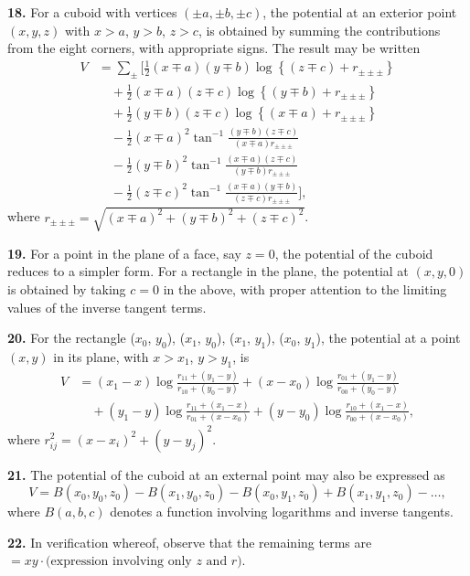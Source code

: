 \documentclass[11pt,a4paper]{article}
\begin{document}
\smallskip\noindent\textbf{18.}\quad
For a cuboid with vertices $(\pm a, \pm b, \pm c)$, the potential at an
exterior point $(x,y,z)$ with $x>a$, $y>b$, $z>c$, is obtained by summing
the contributions from the eight corners, with appropriate signs. The result
may be written
\begin{align*}
V &= \sum_{\pm} \Bigg[
    \tfrac{1}{2}(x\mp a)(y\mp b)\log\left\{(z\mp c)+r_{\pm\pm\pm}\right\} \\
  &\quad + \tfrac{1}{2}(x\mp a)(z\mp c)\log\left\{(y\mp b)+r_{\pm\pm\pm}\right\} \\
  &\quad + \tfrac{1}{2}(y\mp b)(z\mp c)\log\left\{(x\mp a)+r_{\pm\pm\pm}\right\} \\
  &\quad - \tfrac{1}{2}(x\mp a)^2
      \tan^{-1}\frac{(y\mp b)(z\mp c)}{(x\mp a)r_{\pm\pm\pm}} \\
  &\quad - \tfrac{1}{2}(y\mp b)^2
      \tan^{-1}\frac{(x\mp a)(z\mp c)}{(y\mp b)r_{\pm\pm\pm}} \\
  &\quad - \tfrac{1}{2}(z\mp c)^2
      \tan^{-1}\frac{(x\mp a)(y\mp b)}{(z\mp c)r_{\pm\pm\pm}}
  \Bigg],
\end{align*}
where $r_{\pm\pm\pm}=\sqrt{(x\mp a)^2+(y\mp b)^2+(z\mp c)^2}$.

\newpage
\noindent\textbf{19.}\quad
For a point in the plane of a face, say $z=0$, the potential of the cuboid
reduces to a simpler form. For a rectangle in the plane, the potential at
$(x,y,0)$ is obtained by taking $c=0$ in the above, with proper attention to
the limiting values of the inverse tangent terms.

\smallskip\noindent\textbf{20.}\quad
For the rectangle ($x_0$, $y_0$), ($x_1$, $y_0$), ($x_1$, $y_1$), ($x_0$, $y_1$),
the potential at a point $(x,y)$ in its plane, with $x>x_1$, $y>y_1$, is
\begin{align*}
V &= (x_1-x)\log\frac{r_{11}+(y_1-y)}{r_{10}+(y_0-y)}
  + (x-x_0)\log\frac{r_{01}+(y_1-y)}{r_{00}+(y_0-y)} \\
  &\quad + (y_1-y)\log\frac{r_{11}+(x_1-x)}{r_{01}+(x-x_0)}
  + (y-y_0)\log\frac{r_{10}+(x_1-x)}{r_{00}+(x-x_0)},
\end{align*}
where $r_{ij}^2=(x-x_i)^2+(y-y_j)^2$.

\smallskip\noindent\textbf{21.}\quad
The potential of the cuboid at an external point may also be expressed as
\[
V = B(x_0,y_0,z_0) - B(x_1,y_0,z_0) - B(x_0,y_1,z_0)
  + B(x_1,y_1,z_0) - \ldots,
\]
where $B(a,b,c)$ denotes a function involving logarithms and inverse
tangents.

\smallskip\noindent\textbf{22.}\quad
In verification whereof, observe that the remaining terms are
$=xy\cdot\text{(expression involving only $z$ and $r$)}$.
\end{document}
